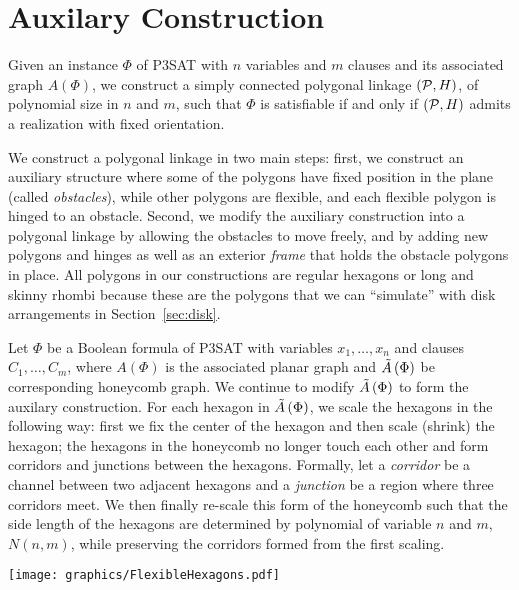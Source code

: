 \section{Auxilary Construction\label{sec:auxiliaryConstruction}}
Given an instance $\Phi$ of P3SAT with $n$ variables and $m$ clauses and its associated graph $A(\Phi)$, we construct a simply connected polygonal linkage $({\cal P},H)$, of polynomial size in $n$ and $m$, such that $\Phi$ is satisfiable if and only if $({\cal P},H)$ admits a realization with fixed orientation. 

We construct a polygonal linkage  in two main steps: first, we construct an auxiliary structure where some of the polygons have fixed position in the plane (called \emph{obstacles}), while other polygons are flexible, and each flexible polygon is hinged to an obstacle. 
Second, we modify the auxiliary construction into a polygonal linkage by allowing the obstacles to move freely, and by adding new polygons and hinges as well as an exterior \emph{frame} that holds the obstacle polygons in place.
All polygons in our constructions are regular hexagons or long and skinny rhombi because these are the polygons that we can ``simulate'' with disk arrangements in Section~\ref{sec:disk}.

Let $\Phi$ be a Boolean formula of P3SAT with variables $x_1,\ldots , x_n$ and clauses $C_1,\ldots ,C_m$, where $A(\Phi)$ is the associated planar graph and $\tilde{A}\left( \Phi \right)$ be corresponding honeycomb graph.
We continue to modify $\tilde{A}\left( \Phi \right)$ to form the auxilary construction.   
For each hexagon in $\tilde{A}\left( \Phi \right)$, we scale the hexagons in the following way: first we fix the center of the hexagon and then scale (shrink) the hexagon; the hexagons in the honeycomb no longer touch each other and form corridors and junctions between the hexagons. 
Formally, let a \textit{corridor} be a channel between two adjacent hexagons and a \textit{junction} be a region where three corridors meet.
We then finally re-scale this form of the honeycomb such that the side length of the hexagons are determined by polynomial of variable $n$ and $m$, $N(n,m)$, while preserving the corridors formed from the first scaling.\newline

\begin{minipage}{\linewidth}
\begin{center}
\texttt{[image: graphics/FlexibleHexagons.pdf]}
\label{fig:HoneycombFlixible.pdf}
\end{center}
\end{minipage}

